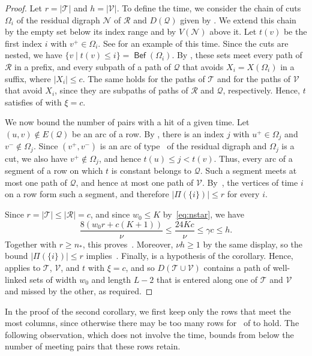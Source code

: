 \documentclass[fontsize=12pt,leading=14pt]{fullpaper}
\DeclareMathOperator{\Bef}{\mathsf{Bef}}
\newcommand{\Ncal}{\mathcal{N}}
\newcommand{\Qcal}{\mathcal{Q}}
\newcommand{\Rcal}{\mathcal{R}}
\newcommand{\Tcal}{\mathcal{T}}
\newcommand{\Vcal}{\mathcal{V}}
\begin{document}
\begin{proof}
  Let $r=|\Tcal|$ and $h=|\Vcal|$.
  To define the time, we consider the chain of cuts $\Omega_i$ of the residual digraph $\Ncal$ of $\Rcal$ and $D(\Qcal)$ given by .
  We extend this chain by the empty set below its index range and by $V(\Ncal)$ above it.
  Let $t(v)$ be the first index $i$ with $v^+\in\Omega_i$.
  See  for an example of this time.
  Since the cuts are nested, we have $\{v\mid t(v)\le i\}=\Bef(\Omega_i)$.
  By , these sets meet every path of $\Rcal$ in a prefix, and every subpath of a path of $\Qcal$ that avoids $X_i=X(\Omega_i)$ in a suffix, where $|X_i|\le c$.
  The same holds for the paths of $\Tcal$ and for the paths of $\Vcal$ that avoid $X_i$, since they are subpaths of paths of $\Rcal$ and $\Qcal$, respectively.
  Hence, $t$ satisfies  of  with $\xi=c$.

  We now bound the number of pairs with a hit of a given time.
  Let $(u,v)\notin E(\Qcal)$ be an arc of a row.
  By , there is an index $j$ with $u^+\in\Omega_j$ and $v^-\notin\Omega_j$.
  Since $(v^+,v^-)$ is an arc of type~ of the residual digraph and $\Omega_j$ is a cut, we also have $v^+\notin\Omega_j$, and hence $t(u)\le j<t(v)$.
  Thus, every arc of a segment of a row on which $t$ is constant belongs to $\Qcal$.
  Such a segment meets at most one path of $\Qcal$, and hence at most one path of $\Vcal$.
  By~, the vertices of time $i$ on a row form such a segment, and therefore $|\Pi(\{i\})|\le r$ for every $i$.

  Since $r=|\Tcal|\le|\Rcal|=c$, and since $w_0\le K$ by~\eqref{eq:nstar}, we have
  \[
    \frac{8(w_0r+c(K+1))}{\nu}
    \le\frac{24Kc}{\nu}\le\gamma c\le h.
  \]
  Together with $r\ge n_*$, this proves~.
  Moreover, $\nu h\ge1$ by the same display, so the bound $|\Pi(\{i\})|\le r$ implies~.
  Finally,  is a hypothesis of the corollary.
  Hence,  applies to $\Tcal$, $\Vcal$, and $t$ with $\xi=c$, and so $D(\Tcal\cup\Vcal)$ contains a path of well-linked sets of width $w_0$ and length $L-2$ that is entered along one of $\Tcal$ and $\Vcal$ and missed by the other, as required.
\end{proof}

In the proof of the second corollary, we first keep only the rows that meet the most columns, since otherwise there may be too many rows for~ of  to hold.
The following observation, which does not involve the time, bounds from below the number of meeting pairs that these rows retain.
\end{document}
